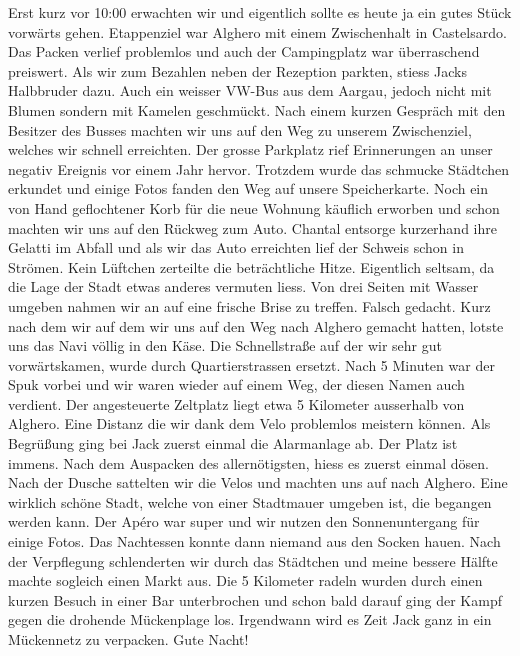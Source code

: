 Erst kurz vor 10:00 erwachten wir und eigentlich sollte es heute ja ein gutes Stück vorwärts gehen.
Etappenziel war Alghero mit einem Zwischenhalt in Castelsardo.
Das Packen verlief problemlos und auch der Campingplatz war überraschend preiswert.
Als wir zum Bezahlen neben der Rezeption parkten, stiess Jacks Halbbruder dazu.
Auch ein weisser VW-Bus aus dem Aargau, jedoch nicht mit Blumen sondern mit Kamelen geschmückt.
Nach einem kurzen Gespräch mit den Besitzer des Busses machten wir uns auf den Weg zu unserem Zwischenziel, welches wir schnell erreichten.
Der grosse Parkplatz rief Erinnerungen an unser negativ Ereignis vor einem Jahr hervor.
Trotzdem wurde das schmucke Städtchen erkundet und einige Fotos fanden den Weg auf unsere Speicherkarte.
Noch ein von Hand geflochtener Korb für die neue Wohnung käuflich erworben und schon machten wir uns auf den Rückweg zum Auto.
Chantal entsorge kurzerhand ihre Gelatti im Abfall und als wir das Auto erreichten lief der Schweis schon in Strömen.
Kein Lüftchen zerteilte die beträchtliche Hitze.
Eigentlich seltsam, da die Lage der Stadt etwas anderes vermuten liess.
Von drei Seiten mit Wasser umgeben nahmen wir an auf eine frische Brise zu treffen.
Falsch gedacht.
Kurz nach dem wir auf dem wir uns auf den Weg nach Alghero gemacht hatten, lotste uns das Navi völlig in den Käse.
Die Schnellstraße auf der wir sehr gut vorwärtskamen, wurde durch Quartierstrassen ersetzt.
Nach 5 Minuten war der Spuk vorbei und wir waren wieder auf einem Weg, der diesen Namen auch verdient.
Der angesteuerte Zeltplatz liegt etwa 5 Kilometer ausserhalb von Alghero.
Eine Distanz die wir dank dem Velo problemlos meistern können.
Als Begrüßung ging bei Jack zuerst einmal die Alarmanlage ab.
Der Platz ist immens.
Nach dem Auspacken des allernötigsten, hiess es zuerst einmal dösen.
Nach der Dusche sattelten wir die Velos und machten uns auf nach Alghero.
Eine wirklich schöne Stadt, welche von einer Stadtmauer umgeben ist, die begangen werden kann.
Der Apéro war super und wir nutzen den Sonnenuntergang für einige Fotos.
Das Nachtessen konnte dann niemand aus den Socken hauen.
Nach der Verpflegung schlenderten wir durch das Städtchen und meine bessere Hälfte machte sogleich einen Markt aus.
Die 5 Kilometer radeln wurden durch einen kurzen Besuch in einer Bar unterbrochen und schon bald darauf ging der Kampf gegen die drohende Mückenplage los.
Irgendwann wird es Zeit Jack ganz in ein Mückennetz zu verpacken. Gute Nacht!

